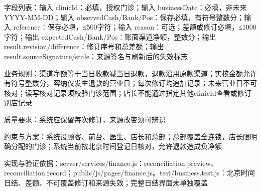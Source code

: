 \documentclass[UTF8,12pt,a4paper,fontset=none]{ctexart}
\begin{document}
字段列表：输入 clinicId：必填，授权门诊；输入 businessDate：必填，非未来 YYYY-MM-DD；输入 observedCash/\allowbreak{}Bank/\allowbreak{}Pos：保存必填，有符号整数分；输入 reference：保存必填，≤500字符；输入 reason：可选；差额或修订必填，≤1000字符；输出 expectedCash/\allowbreak{}Bank/\allowbreak{}Pos：账面渠道净额，整数分；输出 result.\allowbreak{}revision/\allowbreak{}difference：修订序号和总差额；输出 result.\allowbreak{}sourceSignature/\allowbreak{}stale：来源签名与刷新后的失效标志\par
业务规则：渠道净额等于当日收款减当日退款，退款沿用原款渠道；实核金额允许有符号整数分，容纳仅发生退款的营业日；每次修订均追加记录；未来营业日不可核对；读写核对记录须校验门诊范围；店长不能通过指定其他clinicId查看或修订别店记录\par
质量要求：系统应保留每次修订，来源改变须可辨识\par
约束与方案：系统设顾客、前台、医生、店长和总部；总部覆盖全连锁，店长限明确分配的门诊；系统当前按北京时间登记日核对，允许退款造成负净额\par
实现与验证依据：server/\allowbreak{}services/\allowbreak{}finance.\allowbreak{}js：reconciliation.\allowbreak{}preview、reconciliation.\allowbreak{}record；public/\allowbreak{}js/\allowbreak{}pages/\allowbreak{}finance.\allowbreak{}js。test/\allowbreak{}business.\allowbreak{}test.\allowbreak{}js：北京时间日结、差额、不可覆盖修订和来源失效；完整日结界面未单独覆盖\par
{}
\end{document}
